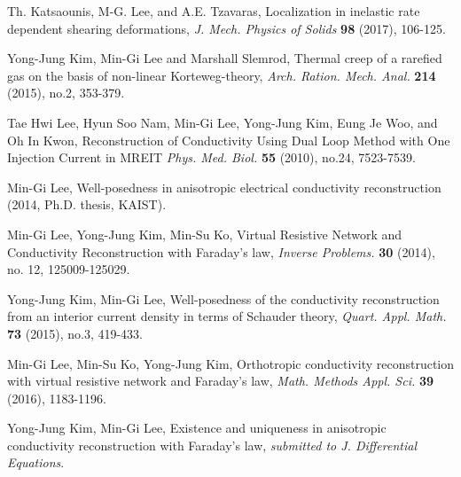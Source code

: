 \documentclass[a4paper,11pt]{article}
\begin{document}
\begin{thebibliography}{10}

{\sc Th. Katsaounis, M-G. Lee, and A.E. Tzavaras},
Localization in inelastic rate dependent shearing deformations,
{\em J.  Mech. Physics of Solids} {\bf 98} (2017), 106-125.

Yong-Jung Kim, Min-Gi Lee and Marshall Slemrod, Thermal creep of a rarefied gas on the basis of non-linear Korteweg-theory, {\it Arch. Ration. Mech. Anal.} {\bf 214} (2015), no.2, 353-379.

Tae Hwi Lee, Hyun Soo Nam, Min-Gi Lee, Yong-Jung Kim, Eung Je Woo, and Oh In Kwon, Reconstruction of Conductivity Using Dual Loop Method with One Injection Current in MREIT {\it Phys. Med. Biol.} {\bf 55} (2010), no.24, 7523-7539.

Min-Gi Lee, Well-posedness in anisotropic electrical conductivity reconstruction (2014, Ph.D. thesis, KAIST). %

Min-Gi Lee, Yong-Jung Kim, Min-Su Ko, Virtual Resistive Network and Conductivity Reconstruction with Faraday's law, {\it Inverse Problems.} {\bf 30} (2014), no. 12, 125009-125029.

Yong-Jung Kim, Min-Gi Lee, Well-posedness of the conductivity reconstruction from an interior current density in terms of Schauder theory, {\it Quart. Appl. Math.} {\bf 73} (2015), no.3, 419-433.

Min-Gi Lee, Min-Su Ko, Yong-Jung Kim, Orthotropic conductivity reconstruction with virtual resistive network and Faraday's law, {\it Math. Methods Appl. Sci.} {\bf 39} (2016), 1183-1196.

Yong-Jung Kim, Min-Gi Lee, Existence and uniqueness in anisotropic conductivity reconstruction with Faraday's law, {\it submitted to J. Differential Equations}.








\end{thebibliography}
\end{document}
